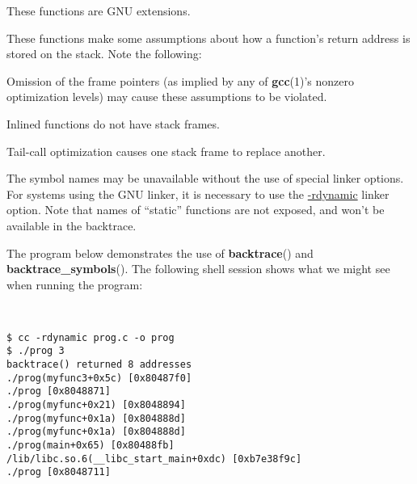 \documentclass[]{article}
\let\realtextbf=\textbf
\renewcommand{\textbf}[1]{\textcolor{boldcolor}{\realtextbf{#1}}}
\renewcommand{\emph}[1]{\underline{#1}}
\begin{document}

These functions are GNU extensions.


These functions make some assumptions about how a function's return
address is stored on the stack. Note the following:

\begin{description}
\itemsep1pt\parskip0pt
\item[*]
Omission of the frame pointers (as implied by any of \textbf{gcc}(1)'s
nonzero optimization levels) may cause these assumptions to be violated.
\end{description}

\begin{description}
\itemsep1pt\parskip0pt
\item[*]
Inlined functions do not have stack frames.
\end{description}

\begin{description}
\itemsep1pt\parskip0pt
\item[*]
Tail-call optimization causes one stack frame to replace another.
\end{description}

The symbol names may be unavailable without the use of special linker
options. For systems using the GNU linker, it is necessary to use the
\emph{-rdynamic} linker option. Note that names of ``static'' functions
are not exposed, and won't be available in the backtrace.


The program below demonstrates the use of \textbf{backtrace}() and
\textbf{backtrace\_symbols}(). The following shell session shows what we
might see when running the program:

\begin{verbatim}


$ cc -rdynamic prog.c -o prog
$ ./prog 3
backtrace() returned 8 addresses
./prog(myfunc3+0x5c) [0x80487f0]
./prog [0x8048871]
./prog(myfunc+0x21) [0x8048894]
./prog(myfunc+0x1a) [0x804888d]
./prog(myfunc+0x1a) [0x804888d]
./prog(main+0x65) [0x80488fb]
/lib/libc.so.6(__libc_start_main+0xdc) [0xb7e38f9c]
./prog [0x8048711]
\end{verbatim}
\end{document}
